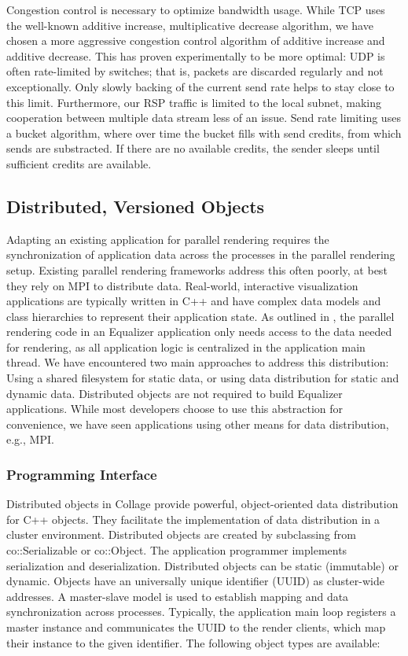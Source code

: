 \documentclass[10pt,journal,compsoc]{IEEEtran}
\begin{document}
Congestion control is necessary to optimize bandwidth usage. While TCP uses the
well-known additive increase, multiplicative decrease algorithm, we have chosen
a more aggressive congestion control algorithm of additive increase and additive
decrease. This has proven experimentally to be more optimal: UDP is often
rate-limited by switches; that is, packets are discarded regularly and not
exceptionally. Only slowly backing of the current send rate helps to stay close
to this limit. Furthermore, our RSP traffic is limited to the local subnet,
making cooperation between multiple data stream less of an issue. Send rate
limiting uses a bucket algorithm, where over time the bucket fills with send
credits, from which sends are substracted. If there are no available credits,
the sender sleeps until sufficient credits are available.

\subsection{Distributed, Versioned Objects}

Adapting an existing application for parallel rendering requires the
synchronization of application data across the processes in the parallel
rendering setup. Existing parallel rendering frameworks address this often
poorly, at best they rely on MPI to distribute data. Real-world, interactive
visualization applications are typically written in C++ and have complex data
models and class hierarchies to represent their application state. As outlined
in \cite{EMP:09}, the parallel rendering code in an \textsf{Equalizer}
application only needs access to the data needed for rendering, as all
application logic is centralized in the application main thread. We have
encountered two main approaches to address this distribution: Using a shared
filesystem for static data, or using data distribution for static and dynamic
data. Distributed objects are not required to build \textsf{Equalizer}
applications. While most developers choose to use this abstraction for
convenience, we have seen applications using other means for data distribution,
e.g., MPI.

\subsubsection{Programming Interface}

Distributed objects in \textsf{Collage} provide powerful, object-oriented data
distribution for C++ objects. They facilitate the implementation of data
distribution in a cluster environment. Distributed objects are created by
subclassing from \textsf{co::Serializable} or \textsf{co::Object}. The
application programmer implements serialization and deserialization. Distributed
objects can be static (immutable) or dynamic. Objects have an universally unique
identifier (UUID) as cluster-wide addresses. A master-slave model is used to
establish mapping and data synchronization across processes. Typically, the
application main loop registers a master instance and communicates the UUID to
the render clients, which map their instance to the given identifier. The
following object types are available:
\end{document}
